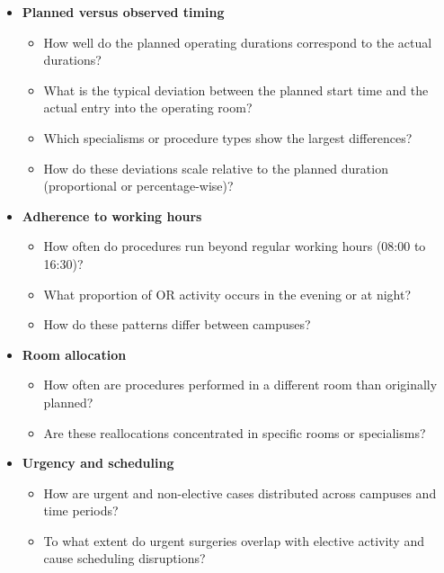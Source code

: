 \documentclass[
]{article}
\providecommand{\tightlist}{%
  \setlength{\itemsep}{0pt}\setlength{\parskip}{0pt}}
\begin{document}
\begin{itemize}
\tightlist
\item
  \textbf{Planned versus observed timing}

  \begin{itemize}
  \tightlist
  \item
    How well do the planned operating durations correspond to the actual
    durations?\\
  \item
    What is the typical deviation between the planned start time and the
    actual entry into the operating room?\\
  \item
    Which specialisms or procedure types show the largest differences?\\
  \item
    How do these deviations scale relative to the planned duration
    (proportional or percentage-wise)?
  \end{itemize}
\item
  \textbf{Adherence to working hours}

  \begin{itemize}
  \tightlist
  \item
    How often do procedures run beyond regular working hours (08:00 to
    16:30)?\\
  \item
    What proportion of OR activity occurs in the evening or at night?\\
  \item
    How do these patterns differ between campuses?
  \end{itemize}
\item
  \textbf{Room allocation}

  \begin{itemize}
  \tightlist
  \item
    How often are procedures performed in a different room than
    originally planned?\\
  \item
    Are these reallocations concentrated in specific rooms or
    specialisms?
  \end{itemize}
\item
  \textbf{Urgency and scheduling}

  \begin{itemize}
  \tightlist
  \item
    How are urgent and non-elective cases distributed across campuses
    and time periods?\\
  \item
    To what extent do urgent surgeries overlap with elective activity
    and cause scheduling disruptions?
  \end{itemize}
\end{itemize}
\end{document}
